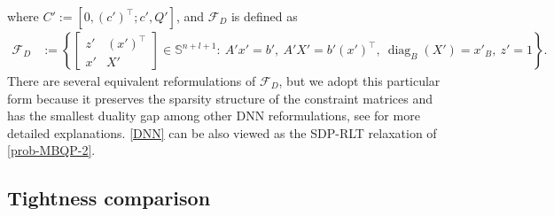 \documentclass[11pt]{article}
\theoremstyle{plain}
\def\F{\mathcal{F}}
\begin{document}
where $C':=[0,(c')^\top; c', Q']$, and $\F_D$ is defined as
\begin{equation*}
\begin{aligned}
\F_D &:= \left\{\begin{bmatrix}
    z'&(x')^\top\\
    x'&X'
\end{bmatrix}\in  \mathbb{S}^{n+l+1} :\ 
A' x'  = b',\
A' X' = b'(x')^\top,\ \operatorname{diag}_B(X')=x'_B,\ z'=1
\right\}.
\end{aligned}
\end{equation*}
There are several equivalent reformulations of $\F_D$, but we adopt this particular form because it preserves the sparsity structure of the constraint matrices and has the smallest duality gap among other DNN reformulations, see \cite{RiNNAL,bomze2017fresh} for more detailed explanations. \eqref{DNN} can be also viewed as the SDP-RLT relaxation of \eqref{prob-MBQP-2}. 




\subsection{Tightness comparison}
\label{Tightness comparison}
\end{document}
